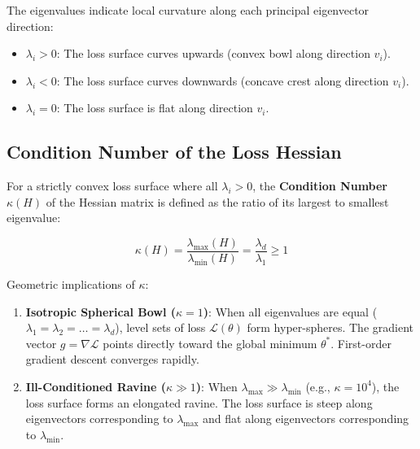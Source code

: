 The eigenvalues indicate local curvature along each principal eigenvector direction:
\begin{itemize}[leftmargin=*]
    \item $\lambda_i > 0$: The loss surface curves upwards (convex bowl along direction $v_i$).
    \item $\lambda_i < 0$: The loss surface curves downwards (concave crest along direction $v_i$).
    \item $\lambda_i = 0$: The loss surface is flat along direction $v_i$.
\end{itemize}

\subsection{Condition Number of the Loss Hessian}
For a strictly convex loss surface where all $\lambda_i > 0$, the \textbf{Condition Number} $\kappa(H)$ of the Hessian matrix is defined as the ratio of its largest to smallest eigenvalue:

\begin{equation}
\kappa(H) = \frac{\lambda_{\max}(H)}{\lambda_{\min}(H)} = \frac{\lambda_d}{\lambda_1} \ge 1
\end{equation}

Geometric implications of $\kappa$:
\begin{enumerate}[leftmargin=*]
    \item \textbf{Isotropic Spherical Bowl ($\kappa = 1$)}: When all eigenvalues are equal ($\lambda_1 = \lambda_2 = \dots = \lambda_d$), level sets of loss $\mathcal{L}(\theta)$ form hyper-spheres. The gradient vector $g = \nabla \mathcal{L}$ points directly toward the global minimum $\theta^*$. First-order gradient descent converges rapidly.
    \item \textbf{Ill-Conditioned Ravine ($\kappa \gg 1$)}: When $\lambda_{\max} \gg \lambda_{\min}$ (e.g., $\kappa = 10^4$), the loss surface forms an elongated ravine. The loss surface is steep along eigenvectors corresponding to $\lambda_{\max}$ and flat along eigenvectors corresponding to $\lambda_{\min}$.
\end{enumerate}

